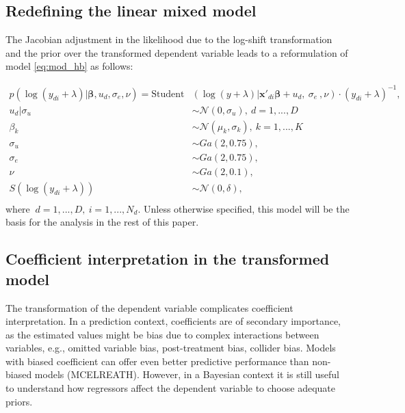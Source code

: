 \subsection{Redefining the linear mixed model}

The Jacobian adjustment in the likelihood due to the log-shift transformation and the prior over the transformed dependent variable leads to a reformulation of model \ref{eq:mod_hb} as follows:

\begin{equation}
    \begin{split}
        p(\log(y_{di} + \lambda) |\boldsymbol \beta, u_d, \sigma_e, \nu)   =        \text{Student}&(\log(y + \lambda)| \boldsymbol{x'}_{di} \boldsymbol \beta + u_d,\ \sigma_e\ , \nu)\cdot (y_{di} + \lambda)^{-1}, \\
        u_d | \sigma_u & \sim \mathcal N(0, \sigma_u),\ d = 1, ..., D \\
        \beta_k & \sim \mathcal N(\mu_k, \sigma_k),\ k = 1, ..., K\\
        \sigma_u & \sim Ga(2, 0.75), \\
        \sigma_e & \sim Ga(2, 0.75), \\
        \nu & \sim Ga(2, 0.1), \\
        S(\log(y_{di} + \lambda)) & \sim \mathcal N(0, \delta),\\
    \end{split}
    \label{eq:trafo_hb}
\end{equation}
where $\ d = 1, ..., D,\ i = 1, ..., N_d$. Unless otherwise specified, this model will be the basis for the analysis in the rest of this paper.

\subsection{Coefficient interpretation in the transformed model}
The transformation of the dependent variable complicates coefficient interpretation.
In a prediction context, coefficients are of secondary importance, as the estimated values might be bias due to complex interactions between variables, e.g., omitted variable bias, post-treatment bias, collider bias.
Models with biased coefficient can offer even better predictive performance than non-biased models (MCELREATH).
However, in a Bayesian context it is still useful to understand how regressors affect the dependent variable to choose adequate priors.

